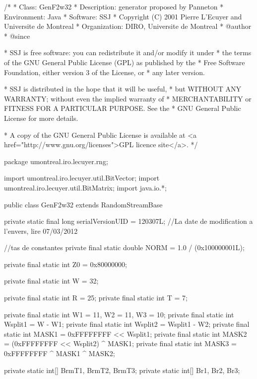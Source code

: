 \begin{code}
\begin{hide}
/*
 * Class:        GenF2w32
 * Description:  generator proposed by Panneton
 * Environment:  Java
 * Software:     SSJ
 * Copyright (C) 2001  Pierre L'Ecuyer and Universite de Montreal
 * Organization: DIRO, Universite de Montreal
 * @author
 * @since

 * SSJ is free software: you can redistribute it and/or modify it under
 * the terms of the GNU General Public License (GPL) as published by the
 * Free Software Foundation, either version 3 of the License, or
 * any later version.

 * SSJ is distributed in the hope that it will be useful,
 * but WITHOUT ANY WARRANTY; without even the implied warranty of
 * MERCHANTABILITY or FITNESS FOR A PARTICULAR PURPOSE.  See the
 * GNU General Public License for more details.

 * A copy of the GNU General Public License is available at
   <a href="http://www.gnu.org/licenses">GPL licence site</a>.
 */
\end{hide}
package umontreal.iro.lecuyer.rng;\begin{hide}

import umontreal.iro.lecuyer.util.BitVector;
import umontreal.iro.lecuyer.util.BitMatrix;
import java.io.*;\end{hide}

public class GenF2w32 extends RandomStreamBase \begin{hide} {

   private static final long serialVersionUID = 120307L;
   //La date de modification a l'envers, lire 07/03/2012

   //tas de constantes
   private final static double NORM = 1.0 / (0x100000001L);

   private final static int Z0 = 0x80000000;

   private final static int W = 32;

   private final static int R = 25;
   private final static int T = 7;

   private final static int W1 = 11, W2 = 11, W3 = 10;
   private final static int Wsplit1 = W - W1;
   private final static int Wsplit2 = Wsplit1 - W2;
   private final static int MASK1 = 0xFFFFFFFF << Wsplit1;
   private final static int MASK2 = (0xFFFFFFFF << Wsplit2) ^ MASK1;
   private final static int MASK3 = 0xFFFFFFFF ^ MASK1 ^ MASK2;

   private static int[] BrmT1, BrmT2, BrmT3;
   private static int[] Br1, Br2, Br3;


}
\end{hide}
\end{code}
